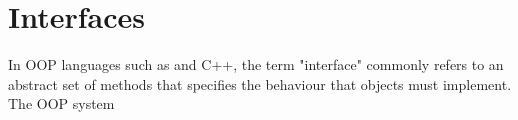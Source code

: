 \section{Interfaces} \label{sec:interfaces}
In OOP languages such as \java and C++, the term "interface" commonly refers to an abstract set of methods that specifies the behaviour that objects must implement. The \matlab OOP system